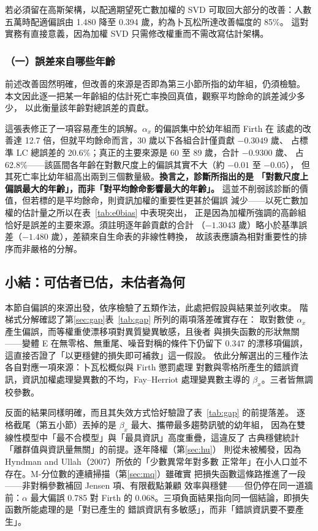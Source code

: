 \documentclass[UTF8, fontset=macnew, a4paper, 12pt]{ctexart}
\newcommand{\cn}[1]{\ding{\number\numexpr171+#1\relax}}
\begin{document}
若必須留在高斯架構，以配適期望死亡數加權的 SVD 可取回大部分的改善：人數
五萬時配適偏誤由 1.480 降至 0.394 歲，約為卜瓦松所達改善幅度的 85\%。
這對實務有直接意義，因為加權 SVD 只需修改權重而不需改寫估計架構。

\subsubsection{（一）誤差來自哪些年齡}

前述改善固然明確，但改善的來源是否即為第三小節所指的幼年組，仍須檢驗。
本文因此逐一把某一年齡組的估計死亡率換回真值，觀察平均餘命的誤差減少多少，
以此衡量該年齡對總誤差的貢獻。

這張表修正了一項容易產生的誤解。$\alpha_x$ 的偏誤集中於幼年組而 Firth 在
該處的改善達 12.7 倍，但就平均餘命而言，30 歲以下各組合計僅貢獻 $-0.3049$ 歲、
占標準 LC 總誤差的 20.6\%；真正的主要來源是 60 至 89 歲，合計 $-0.9300$ 歲、
占 62.8\%——該區間各年齡在對數尺度上的偏誤其實不大（約 $-0.01$ 至 $-0.05$），
但其死亡率比幼年組高出兩到三個數量級。\textbf{換言之，診斷\cn{2}所指出的是
「對數尺度上偏誤最大的年齡」，而非「對平均餘命影響最大的年齡」。}
這並不削弱該診斷的價值，但若標的是平均餘命，則資訊加權的重要性更甚於偏誤
減少——以死亡數加權的估計量之所以在表~\ref{tab:e0bias} 中表現突出，
正是因為加權所強調的高齡組恰好是誤差的主要來源。須註明逐年齡貢獻的合計
（$-1.3043$ 歲）略小於基準誤差（$-1.480$ 歲），差額來自生命表的非線性轉換，
故該表應讀為相對重要性的排序而非嚴格的分解。



\subsection{小結：可估者已估，未估者為何}

本節自偏誤的來源出發，依序檢驗了五類作法，此處把假設與結果並列收束。
階梯式分解確認了第\ref{sec:gap}表~\ref{tab:gap} 所列的兩項落差確實存在：
取對數使 $\alpha_x$ 產生偏誤，而等權重使漂移項對異質變異敏感，且後者
與損失函數的形狀無關——變體 E 在無零格、無重尾、噪音對稱的條件下仍留下
0.347 的漂移項偏誤，這直接否證了「以更穩健的損失即可補救」這一假設。
依此分解選出的三種作法各自對應一項來源：卜瓦松概似與 Firth 懲罰處理
對數與零格所產生的錯誤資訊，資訊加權處理變異數的不均，Fay--Herriot
處理變異數主導的 $\beta_x$。三者皆無調校參數。

反面的結果同樣明確，而且其失效方式恰好驗證了表~\ref{tab:gap} 的前提落差。
逐格截尾（第五小節）丟掉的是 $\beta_x$ 最大、攜帶最多趨勢訊號的幼年組，
因為在雙線性模型中「最不合模型」與「最具資訊」高度重疊，這違反了
古典穩健統計「離群值與資訊量無關」的前提。逐年降權（第\ref{sec:hu}）
則從未被觸發，因為 Hyndman and Ullah（2007）所依的「少數異常年對多數
正常年」在小人口並不存在。M-分位數的連續掃描（第\ref{sec:mq}）雖確實
把損失函數這條路推進了一段——非對稱參數補回 Jensen 項、有限截點兼顧
效率與穩健——但仍停在同一道牆前：$\alpha$ 最大偏誤 0.785 對 Firth 的
0.068。三項負面結果指向同一個結論，即損失函數所能處理的是「對已產生的
錯誤資訊有多敏感」，而非「錯誤資訊要不要產生」。
\end{document}
